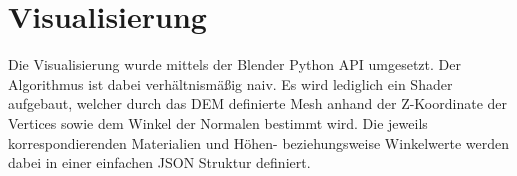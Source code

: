 \section {Visualisierung}

Die Visualisierung wurde mittels der Blender Python API umgesetzt. Der Algorithmus ist dabei verhältnismäßig naiv. Es wird lediglich ein Shader aufgebaut, welcher durch das \ac{DEM} definierte Mesh anhand der Z-Koordinate der Vertices sowie dem Winkel der Normalen bestimmt wird. Die jeweils korrespondierenden Materialien und Höhen- beziehungsweise Winkelwerte werden dabei in einer einfachen JSON Struktur definiert.